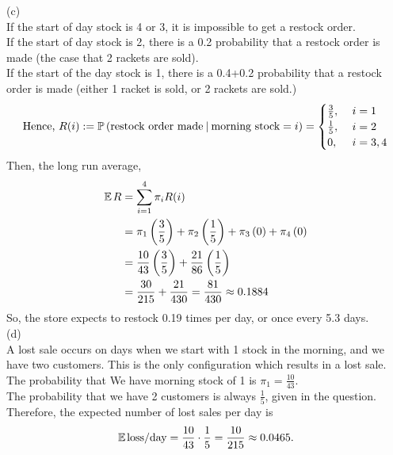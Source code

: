 \documentclass[a4paper,12pt]{report}
\begin{document}
\sol(c)\\
If the start of day stock is 4 or 3, it is impossible to get a restock order. \\
If the start of day stock is 2, there is a 0.2 probability that a restock order is made (the case that 2 rackets are sold). \\
If the start of the day stock is 1, there is a 0.4+0.2 probability that a restock order is made (either 1 racket is sold, or 2 rackets are sold.) \\
$$
    \text{Hence,\ } R(i) := \mathbb{P}\left( \text{restock order made}\medspace\middle|\medspace \text{morning stock}=i \right) = \begin{cases}
        \frac{3}{5}, &\ i=1 \\
        \frac{1}{5}, &\ i=2 \\
        0,           &\ i=3,4 \\
    \end{cases}
$$
Then, the long run average,
\begin{align*}
    \mathbb{E}\hspace{0.13em} R &= \sum_{i=1}^{4} \pi_i R(i) \\
        &= \pi_1\left( \frac{3}{5} \right) + \pi_2\left( \frac{1}{5} \right) + \pi_3\left( 0 \right) + \pi_4\left( 0 \right) \\
        &= \frac{10}{43}\left( \frac{3}{5} \right) + \frac{21}{86}\left( \frac{1}{5} \right) \\
        &= \frac{30}{215} + \frac{21}{430} = \frac{81}{430} \approx 0.1884
\end{align*}
So, the store expects to restock 0.19 times per day, or once every 5.3 days. \\

\sol(d)\\
A lost sale occurs on days when we start with 1 stock in the morning, and we have two customers. This is the only configuration which results in a lost sale.\\
The probability that We have morning stock of 1 is $\pi_1 = \frac{10}{43}$. \\
The probability that we have 2 customers is always $\frac{1}{5}$, given in the question. \\
Therefore, the expected number of lost sales per day is
$$
    \mathbb{E}\hspace{0.13em} \text{loss}/\text{day} = \frac{10}{43}\cdot\frac{1}{5} = \frac{10}{215} \approx 0.0465.
$$
\end{document}
